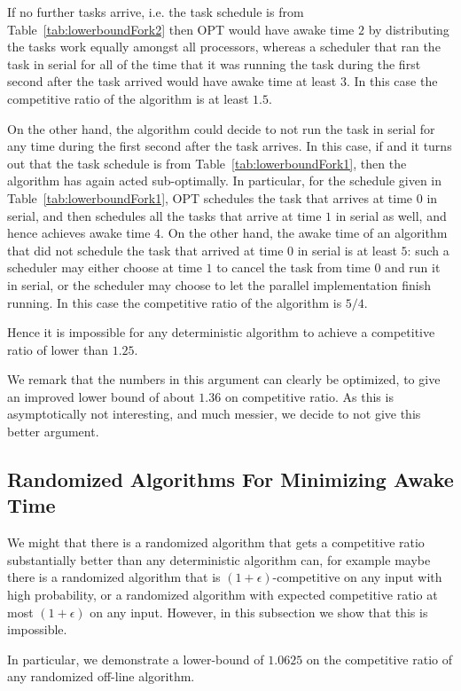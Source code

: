 If no further tasks arrive, i.e. the task schedule is from
Table~\ref{tab:lowerboundFork2} then OPT would have awake time
$2$ by distributing the tasks work equally amongst all
processors, whereas a scheduler that ran the task in serial for
all of the time that it was running the task during the first
second after the task arrived would have awake time at least $3$.
In this case the competitive ratio of the algorithm is at least $1.5$.

On the other hand, the algorithm could decide to not run the task
in serial for any time during the first second after the task
arrives. In this case, if
and it turns out that the task schedule is from
Table~\ref{tab:lowerboundFork1}, then the algorithm has again
acted sub-optimally. In particular, for the schedule given in
Table~\ref{tab:lowerboundFork1}, OPT schedules the task that
arrives at time $0$ in serial, and then schedules all the tasks
that arrive at time $1$ in serial as well, and hence achieves
awake time $4$. On the other hand, the awake time of an algorithm
that did not schedule the task that arrived at time $0$ in
serial is at least $5$: such a scheduler may either choose at
time $1$ to cancel the task from time $0$ and run it in serial,
or the scheduler may choose to let the parallel implementation
finish running. In this case the competitive ratio of the
algorithm is $5/4$.

Hence it is impossible for any deterministic algorithm to achieve
a competitive ratio of lower than $1.25$.

We remark that the numbers in this argument can clearly be
optimized, to give an improved lower bound of about $1.36$ on
competitive ratio. As this is asymptotically not interesting, and
much messier, we decide to not give this better argument.

\subsection{Randomized Algorithms For Minimizing Awake Time}
We might that there is a randomized algorithm that gets a
competitive ratio substantially better than any deterministic
algorithm can, for example maybe there is a randomized algorithm
that is $(1+\epsilon)$-competitive on any input with high
probability, or a randomized algorithm with expected competitive
ratio at most $(1+\epsilon)$ on any input. However, in this
subsection we show that this is impossible.

In particular, we demonstrate a lower-bound of $1.0625$ on the
competitive ratio of any randomized off-line algorithm.

